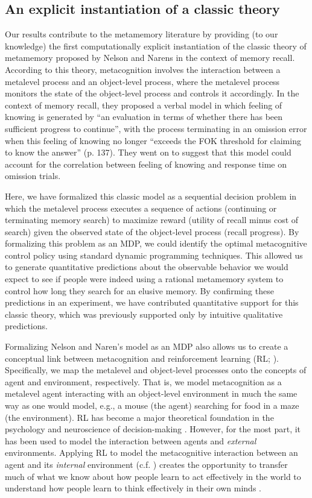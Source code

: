 \subsection{An explicit instantiation of a classic theory}

Our results contribute to the metamemory literature by providing (to our knowledge) the first computationally explicit instantiation of the classic theory of metamemory proposed by Nelson and Narens \citeyearpar{nelson1990metamemory} in the context of memory recall. According to this theory, metacognition involves the interaction between a metalevel process and an object-level process, where the metalevel process monitors the state of the object-level process and controls it accordingly. In the context of memory recall, they proposed a verbal model in which feeling of knowing is generated by ``an evaluation in terms of whether there has been sufficient progress to continue'', with the process terminating in an omission error when this feeling of knowing no longer ``exceeds the FOK threshold for claiming to know the answer'' (p. 137). They went on to suggest that this model could account for the correlation between feeling of knowing and response time on omission trials.

Here, we have formalized this classic model as a sequential decision problem in which the metalevel process executes a sequence of actions (continuing or terminating memory search) to maximize reward (utility of recall minus cost of search) given the observed state of the object-level process (recall progress). By formalizing this problem as an MDP, we could identify the optimal metacognitive control policy using standard dynamic programming techniques. This allowed us to generate quantitative predictions about the observable behavior we would expect to see if people were indeed using a rational metamemory system to control how long they search for an elusive memory. By confirming these predictions in an experiment, we have contributed quantitative support for this classic theory, which was previously supported only by intuitive qualitative predictions.

Formalizing Nelson and Naren's model as an MDP also allows us to create a conceptual link between metacognition and reinforcement learning (RL; \citealp{sutton2018reinforcement}). Specifically, we map the metalevel and object-level processes onto the concepts of agent and environment, respectively. That is, we model metacognition as a metalevel agent interacting with an object-level environment in much the same way as one would model, e.g., a mouse (the agent) searching for food in a maze (the environment). RL has become a major theoretical foundation in the psychology and neuroscience of decision-making \citep{niv2009reinforcement,dayan2008decision,glimcher2011understanding}. However, for the most part, it has been used to model the interaction between agents and \emph{external} environments. Applying RL to model the metacognitive interaction between an agent and its \emph{internal} environment (c.f. \citealp{simon1955behavioral}) creates the opportunity to transfer much of what we know about how people learn to act effectively in the world to understand how people learn to think effectively in their own minds \citep{lieder2018rational}.

